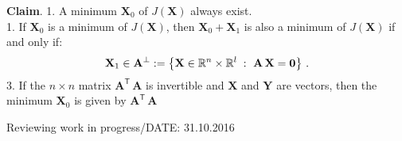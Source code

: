 \begin{description}[style=unboxed,leftmargin=0cm,itemsep=3ex]
\vspace{3ex}
{\bf Claim}. 
1. A minimum $\mathbf{X}_0$ of $J(\mathbf{X})$ always exist. \\
1. If $\mathbf{X}_0$ is a minimum of $J(\mathbf{X})$, then
$\mathbf{X}_0+\mathbf{X}_1$ is also a minimum of $J(\mathbf{X})$
if and only if: 
\begin{equation}
\mathbf{X}_1\in \mathbf{A}^{\perp}:=
\left\{ \mathbf{X}\in{\mathbb R }^n\times{\mathbb R }^l \;:\ 
        \mathbf{A}\,\mathbf{X}=\mathbf{0} \right\}\,.
\end{equation}
3. If the $n\times n$ matrix $\mathbf{A}^{\mathsf{T}}\,\mathbf{A}$ is
invertible and $\mathbf{X}$ and $\mathbf{Y}$ are vectors, then 
the minimum $\mathbf{X}_0$ is given by
$\mathbf{A}^{\mathsf{T}}\,\mathbf{A}$

\end{description}

\vspace{2ex}
Reviewing work in progress/DATE: 31.10.2016

